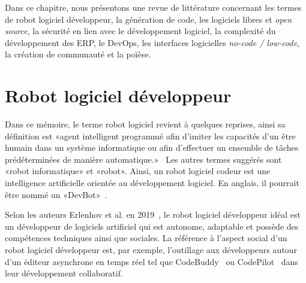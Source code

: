 \label{sec:RevLitt}
Dans ce chapitre, nous présentons une revue de littérature concernant les termes de robot logiciel développeur, la génération de code, les logiciels libres et \textit{open source}, la sécurité en lien avec le développement logiciel, la complexité du développement des ERP, le DevOps, les interfaces logicielles \textit{no-code / low-code}, la création de communauté et la poïèse.
\section{Robot logiciel développeur}\label{robot_logiciel_developpeur_revue}


Dans ce mémoire, le terme robot logiciel revient à quelques reprises, ainsi sa définition est «agent intelligent programmé afin d'imiter les capacités d'un être humain dans un système informatique ou afin d'effectuer un ensemble de tâches prédéterminées de manière automatique.»~\cite{robot_logiciel_oqlf_2018} Les autres termes suggérés sont «robot informatique» et «robot». Ainsi, un robot logiciel codeur est une intelligence artificielle orientée au développement logiciel. En anglais, il pourrait être nommé un «DevBot»~\cite{8823643}.

Selon les auteurs Erlenhov et al. en 2019~\cite{8823643}, le robot logiciel développeur idéal est un développeur de logiciels artificiel qui est autonome, adaptable et possède des compétences techniques ainsi que sociales. La référence à l'aspect social d'un robot logiciel développeur est, par exemple, l'outillage aux développeurs autour d'un éditeur asynchrone en temps réel tel que CodeBuddy~\cite{10.1145/3287324.3293750} ou CodePilot~\cite{10.5555/1030453.1030540} dans leur développement collaboratif.


